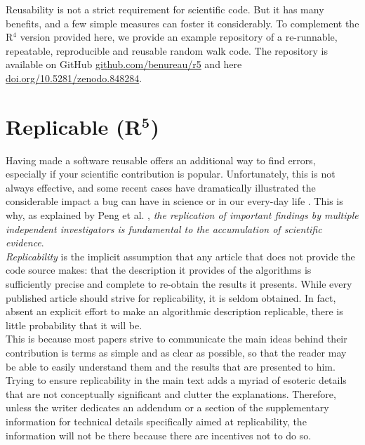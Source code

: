 \documentclass[a4paper,11pt]{article}
\begin{document}
Reusability is not a strict requirement for scientific code. But it has many benefits, and a few simple measures can foster it considerably. To complement the R$^4$ version provided here, we provide an example repository of a re-runnable, repeatable, reproducible and reusable random walk code. The repository is available on GitHub \href{https://github.com/benureau/r5}{github.com/benureau/r5} and here \href{https://doi.org/10.5281/zenodo.848284}{doi.org/10.5281/zenodo.848284}.


\section*{Replicable (R$^{\mathbf 5}$)}

Having made a software reusable offers an additional way to find errors, especially if your scientific contribution is popular. Unfortunately, this is not always effective, and some recent cases have dramatically illustrated the considerable impact a bug can have in science
\citep{Eklund:2016} or in our every-day life \citep{Durumeric:2014}. This is
why, as explained by Peng et al. \citep{Peng:2006}, {\em the replication of
  important findings by multiple independent investigators is fundamental to
  the accumulation of scientific evidence}.\\

\emph{Replicability} is the implicit
assumption that any article that does not provide the code source makes: that
the description it provides of the algorithms is sufficiently precise and
complete to re-obtain the results it presents. While every published article
should strive for replicability, it is seldom obtained. In fact, absent an explicit effort to make an algorithmic description replicable, there is little probability that it will be.\\

This is because most papers strive to communicate the main ideas behind their contribution is terms as simple and as clear as possible, so that the reader may be able to easily understand them and the results that are presented to him. Trying to ensure replicability in the main text adds a myriad of esoteric details that are not conceptually significant and clutter the explanations. Therefore, unless the writer dedicates an addendum or a section of the supplementary information for technical details specifically aimed at replicability, the information will not be there because there are incentives not to do so.\\
\end{document}
